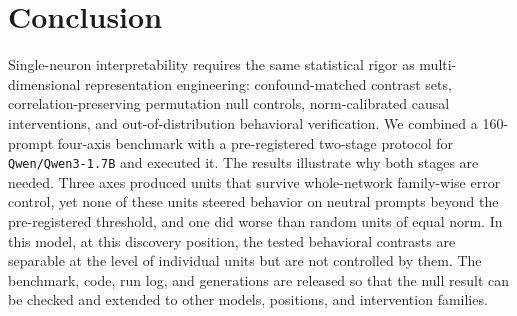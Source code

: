\documentclass[11pt, a4paper]{article}
\begin{document}
\section{Conclusion}

Single-neuron interpretability requires the same statistical rigor as multi-dimensional representation engineering: confound-matched contrast sets, correlation-preserving permutation null controls, norm-calibrated causal interventions, and out-of-distribution behavioral verification. We combined a 160-prompt four-axis benchmark with a pre-registered two-stage protocol for \texttt{Qwen/\allowbreak{}Qwen3-1.7B} and executed it. The results illustrate why both stages are needed. Three axes produced units that survive whole-network family-wise error control, yet none of these units steered behavior on neutral prompts beyond the pre-registered threshold, and one did worse than random units of equal norm. In this model, at this discovery position, the tested behavioral contrasts are separable at the level of individual units but are not controlled by them. The benchmark, code, run log, and generations are released so that the null result can be checked and extended to other models, positions, and intervention families.
\end{document}
